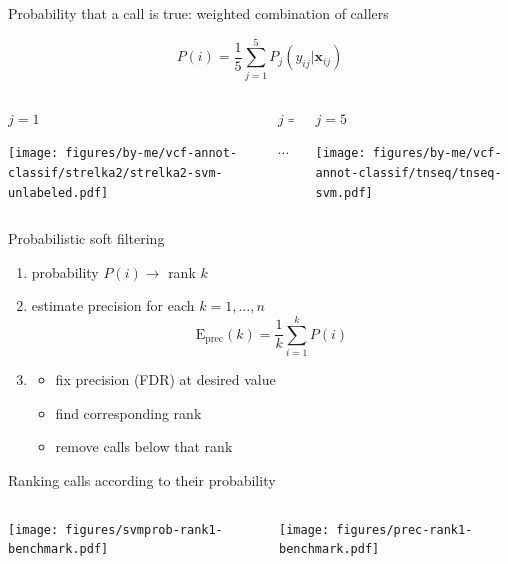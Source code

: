 \documentclass{beamer}
\begin{document}
\begin{frame}{Probability that a call is true: weighted combination of callers}
\begin{center}
\[
P(i) = \frac{1}{5} \sum_{j=1}^5 P_j(y_{ij} | \mathbf{x}_{ij})
\]
\end{center}
\begin{columns}[t]
\begin{column}{0.33\textwidth}
\begin{center}
\(j=1\)
\end{center}

\texttt{[image: figures/by-me/vcf-annot-classif/strelka2/strelka2-svm-unlabeled.pdf]}
\end{column}

\begin{column}{0.33\textwidth}
\begin{center}
\(j=...\)

\vspace{0.7in}
\large
\(\cdots\)
\normalsize
\end{center}
\end{column}

\begin{column}{0.33\textwidth}
\begin{center}
\(j=5\)
\end{center}

\texttt{[image: figures/by-me/vcf-annot-classif/tnseq/tnseq-svm.pdf]}
\end{column}
\end{columns}
\end{frame}

\begin{frame}{Probabilistic soft filtering}
\begin{enumerate}
\item probability \(P(i) \rightarrow \) rank \(k\)
\item estimate precision for each \(k=1,...,n\)
\[
\mathrm{E}_\mathrm{prec}(k) = \frac{1}{k} \sum_{i=1}^k P(i)
\] 
\item
\begin{itemize}
\item fix precision (FDR) at desired value
\item find corresponding rank
\item remove calls below that rank 
\end{itemize}
\end{enumerate}
\end{frame}

\begin{frame}{Ranking calls according to their probability}
\begin{columns}[t]
\begin{column}{0.5\textwidth}

\texttt{[image: figures/svmprob-rank1-benchmark.pdf]}
\end{column}

\begin{column}{0.5\textwidth}

\texttt{[image: figures/prec-rank1-benchmark.pdf]}
\end{column}
\end{columns}
\end{frame}
\end{document}
